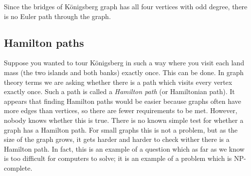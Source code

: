 \documentclass[12pt]{article}
\begin{document}
Since the bridges of K\"onigsberg graph has all four vertices with odd degree, there is no Euler path through the graph.

\subsection{Hamilton paths}

Suppose you wanted to tour K\"onigsberg in such a way where you visit each land mass (the two islands and both banks) exactly once.  This can be done.  In graph theory terms we are asking whether there is a path which visits every vertex exactly once.  Such a path is called a {\em Hamilton path} (or Hamiltonian path).  It appears that finding Hamilton paths would be easier because graphs often have more edges than vertices, so there are fewer requirements to be met.  However, nobody knows whether this is true.  There is no known simple test for whether a graph has a Hamilton path.  For small graphs this is not a problem, but as the size of the graph grows, it gets harder and harder to check wither there is a Hamilton path.  In fact, this is an example of a question which as far as we know is too difficult for computers to solve; it is an example of a problem which is NP-complete.  
\end{document}
